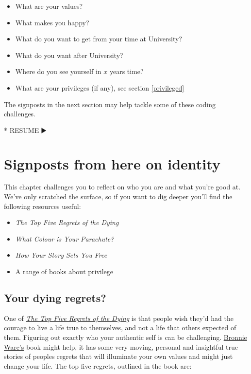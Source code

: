 \documentclass[
]{book}
\newenvironment{Shaded}{\begin{snugshade}}{\end{snugshade}}
\newcommand{\NormalTok}[1]{#1}
\newcommand{\SpecialStringTok}[1]{\textcolor[rgb]{0.31,0.60,0.02}{#1}}
\providecommand{\tightlist}{%
  \setlength{\itemsep}{0pt}\setlength{\parskip}{0pt}}
\begin{document}
\begin{itemize}
\tightlist
\item
  What are your values?
\item
  What makes you happy?
\item
  What do you want to get from your time at University?
\item
  What do you want after University?
\item
  Where do you see yourself in \(x\) years time?
\item
  What are your privileges (if any), see section \ref{privileged}
\end{itemize}

The signposts in the next section may help tackle some of these coding challenges.

\begin{Shaded}
\begin{Highlighting}[]
\SpecialStringTok{* }\NormalTok{RESUME ▶️}
\end{Highlighting}
\end{Shaded}

\hypertarget{sign2}{%
\section{Signposts from here on identity}\label{sign2}}

This chapter challenges you to reflect on who you are and what you're good at. We've only scratched the surface, so if you want to dig deeper you'll find the following resources useful:

\begin{itemize}
\tightlist
\item
  \emph{The Top Five Regrets of the Dying}
\item
  \emph{What Colour is Your Parachute?}
\item
  \emph{How Your Story Sets You Free}
\item
  A range of books about privilege
\end{itemize}

\hypertarget{regret}{%
\subsection{Your dying regrets?}\label{regret}}

One of \emph{\href{https://en.wikipedia.org/wiki/The_Top_Five_Regrets_of_the_Dying}{The Top Five Regrets of the Dying}} \citep{regrets} is that people wish they'd had the courage to live a life true to themselves, and not a life that others expected of them. Figuring out exactly who your authentic self is can be challenging. \href{https://en.wikipedia.org/wiki/Bronnie_Ware}{Bronnie Ware's} book might help, it has some very moving, personal and insightful true stories of peoples regrets that will illuminate your own values and might just change your life. The top five regrets, outlined in the book are:
\end{document}
